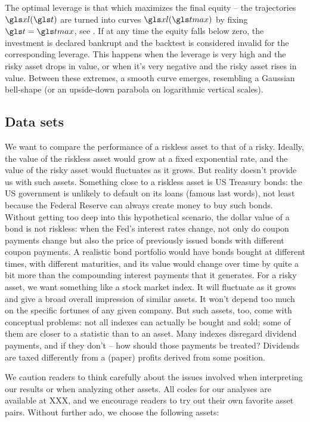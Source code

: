 The optimal leverage is that which maximizes the final equity -- the trajectories $\xl(\t)$ are turned into curves $\xl(\tmax)$ by fixing $\t=\tmax$, see . 
If at any time the equity falls below zero, the investment is declared bankrupt and the backtest is considered invalid for the corresponding leverage. This happens when the leverage is very high and the risky asset drops in value, or when it's very negative and the risky asset rises in value. Between these extremes, a smooth curve emerges, resembling a Gaussian bell-shape (or an upside-down parabola on logarithmic vertical scales).

\FloatBarrier 
\subsection{Data sets}
We want to compare the performance of a riskless asset to that of a risky. Ideally, the value of the riskless asset would grow at a fixed exponential rate, and the value of the risky asset would fluctuates as it grows. But reality doesn't provide us with such assets. Something close to a riskless asset is US Treasury bonds: the US government is unlikely to default on its loans (famous last words), not least because the Federal Reserve can always create money to buy such bonds. Without getting too deep into this hypothetical scenario, the dollar value of a bond is not riskless: when the Fed's interest rates change, not only do coupon payments change but also the price of previously issued bonds with different coupon payments. A realistic bond portfolio would have bonds bought at different times, with different maturities, and its value would change over time by quite a bit more than the compounding interest payments that it generates. For a risky asset, we want something like a stock market index. It will fluctuate as it grows and give a broad overall impression of similar assets. It won't depend too much on the specific fortunes of any given company. But such assets, too, come with conceptual problems: not all indexes can actually be bought and sold; some of them are closer to a statistic than to an asset. Many indexes disregard dividend payments, and if they don't -- how should those payments be treated? Dividends are taxed differently from a (paper) profits derived from some position.

We caution readers to think carefully about the issues involved when interpreting our results or when analyzing other assets. All codes for our analyses are available at XXX, and we encourage readers to try out their own favorite asset pairs. Without further ado, we choose the following assets:

